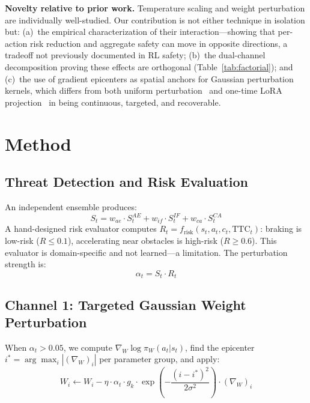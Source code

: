 \documentclass[runningheads]{llncs}
\begin{document}
\textbf{Novelty relative to prior work.} Temperature scaling and weight perturbation are individually well-studied. Our contribution is not either technique in isolation but: (a)~the empirical characterization of their interaction---showing that per-action risk reduction and aggregate safety can move in opposite directions, a tradeoff not previously documented in RL safety; (b)~the dual-channel decomposition proving these effects are orthogonal (Table~\ref{tab:factorial}); and (c)~the use of gradient epicenters as spatial anchors for Gaussian perturbation kernels, which differs from both uniform perturbation~\cite{rwp2024} and one-time LoRA projection~\cite{safelora2024} in being continuous, targeted, and recoverable.

\FloatBarrier
\section{Method}
\label{sec:method}

\subsection{Threat Detection and Risk Evaluation}

An independent ensemble produces:
\begin{equation}
S_t = w_{ae} \cdot S_t^{AE} + w_{if} \cdot S_t^{IF} + w_{ca} \cdot S_t^{CA}
\label{eq:salience}
\end{equation}
A hand-designed risk evaluator computes $R_t = f_{\text{risk}}(s_t, a_t, c_t, \text{TTC}_t)$: braking is low-risk ($R \leq 0.1$), accelerating near obstacles is high-risk ($R \geq 0.6$). This evaluator is domain-specific and not learned---a limitation. The perturbation strength is:
\begin{equation}
\alpha_t = S_t \cdot R_t
\label{eq:alpha}
\end{equation}

\subsection{Channel 1: Targeted Gaussian Weight Perturbation}

When $\alpha_t > 0.05$, we compute $\nabla_W \log \pi_W(a_t | s_t)$, find the epicenter $i^* = \arg\max_i |(\nabla_W)_i|$ per parameter group, and apply:
\begin{equation}
W_i \leftarrow W_i - \eta \cdot \alpha_t \cdot g_k \cdot \exp\!\left(-\frac{(i - i^*)^2}{2\sigma^2}\right) \cdot (\nabla_W)_i
\label{eq:gaussian}
\end{equation}
\end{document}
